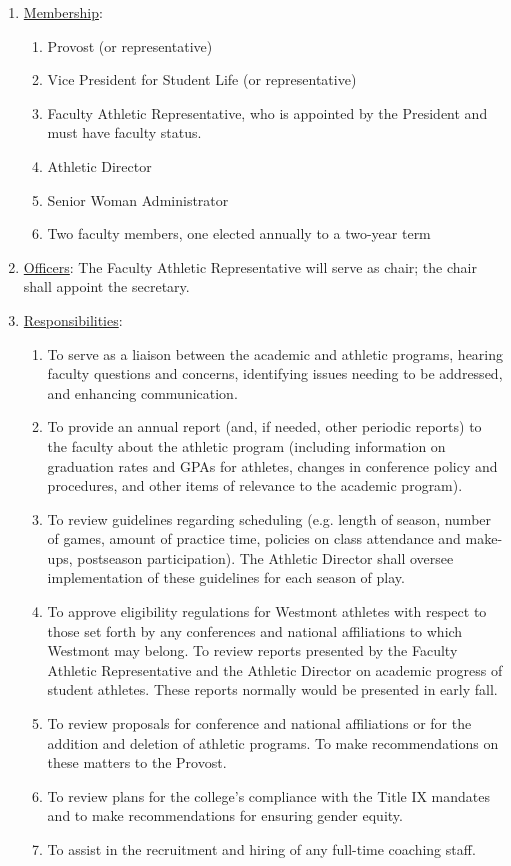 					\begin{enumerate}[label=\alph*)]
						\item{\underline{Membership}:
							\begin{enumerate}[label=\arabic*)]
								\item{Provost (or representative)}
								\item{Vice President for Student Life (or representative)}
								\item{Faculty Athletic Representative, who is appointed by the President and must have faculty status.}
								\item{Athletic Director}
								\item{Senior Woman Administrator}
								\item{Two faculty members, one elected annually to a two-year term}
							\end{enumerate}
						}
						\item{\underline{Officers}:
							The Faculty Athletic Representative will serve as chair; the chair shall appoint the secretary.
						}
						\item{\underline{Responsibilities}:
							\begin{enumerate}[label=\arabic*)]
								\item{To serve as a liaison between the academic and athletic programs, hearing faculty questions and concerns, identifying issues needing to be addressed, and enhancing communication.}
								\item{To provide an annual report (and, if needed, other periodic reports) to the faculty about the athletic program (including information on graduation rates and GPAs for athletes, changes in conference policy and procedures, and other items of relevance to the academic program).}
								\item{To review guidelines regarding scheduling (e.g. length of season, number of games, amount of practice time, policies on class attendance and make-ups, postseason participation).  The Athletic Director shall oversee implementation of these guidelines for each season of play.}
								\item{To approve eligibility regulations for Westmont athletes with respect to those set forth by any conferences and national affiliations to which Westmont may belong.  To review reports presented by the Faculty Athletic Representative and the Athletic Director on academic progress of student athletes.  These reports normally would be presented in early fall.}
								\item{To review proposals for conference and national affiliations or for the addition and deletion of athletic programs.  To make recommendations on these matters to the Provost.}
								\item{To review plans for the college's compliance with the Title IX mandates and to make recommendations for ensuring gender equity.}
								\item{To assist in the recruitment and hiring of any full-time coaching staff.}
							\end{enumerate}
						}
					\end{enumerate}
